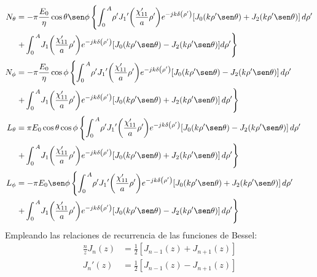 \begin{subequations}
\label{grup_ec_apC:28}
\begin{align}
N_{\theta} &= - \pi\dfrac{E_0}{\eta}\cos\theta\sen\phi\left\{\int_{0}^{\,A}\!\rho '{J_1}'\!\left(\frac{\chi '_{11}}{a}\rho '\right)\!e^{-jk\delta\left(\rho '\right)}\!\left[J_0\!\left(k\rho '\sen\theta\right) + J_2\!\left(k\rho '\sen\theta\right)\right]d\rho '\right.\notag\\
&\left.+\int_{0}^{\,A}\!J_1\!\left(\frac{\chi '_{11}}{a}\rho '\right)\!e^{-jk\delta\left(\rho '\right)}\!\left[J_0\!\left(k\rho '\sen\theta\right) - J_2\!\left(k\rho '\sen\theta\right)\right]\!d\rho '\right\}
\label{ec_apC:125}\\
N_{\phi} &= - \pi\dfrac{E_0}{\eta}\cos\phi\left\{\int_{0}^{\,A}\!\rho '{J_1}'\!\left(\frac{\chi '_{11}}{a}\rho '\right)\!e^{-jk\delta\left(\rho '\right)}\!\left[J_0\!\left(k\rho '\sen\theta\right) - J_2\!\left(k\rho '\sen\theta\right)\right]d\rho '\right.\notag\\
&\left.+\int_{0}^{\,A}\!J_1\!\left(\frac{\chi '_{11}}{a}\rho '\right)\!e^{-jk\delta\left(\rho '\right)}\!\left[J_0\!\left(k\rho '\sen\theta\right) + J_2\!\left(k\rho '\sen\theta\right)\right]d\rho '\right\}
\label{ec_apC:126}\\
L_{\theta}  &= \pi E_0\cos\theta\cos\phi\left\{\int_{0}^{\,A}\!\rho '{J_1}'\!\left(\frac{\chi '_{11}}{a}\rho '\right)\!e^{-jk\delta\left(\rho '\right)}\!\left[J_0\!\left(k\rho '\sen\theta\right) - J_2\!\left(k\rho '\sen\theta\right)\right]d\rho '\right.\notag\\
&\left.+\int_{0}^{\,A}\!J_1\!\left(\frac{\chi '_{11}}{a}\rho '\right)\!e^{-jk\delta\left(\rho '\right)}\!\left[J_0\!\left(k\rho '\sen\theta\right) + J_2\!\left(k\rho '\sen\theta\right)\right]d\rho '\right\}
\label{ec_apC:127}\\
L_{\phi} &= - \pi E_0\sen\phi\left\{\int_{0}^{\,A}\!\rho '{J_1}'\!\left(\frac{\chi '_{11}}{a}\rho '\right)\!e^{-jk\delta\left(\rho '\right)}\!\left[J_0\!\left(k\rho '\sen\theta\right) + J_2\!\left(k\rho '\sen\theta\right)\right]d\rho '\right.\notag\\
&\left.+\int_{0}^{\,A}\!J_1\!\left(\frac{\chi '_{11}}{a}\rho '\right)\!e^{-jk\delta\left(\rho '\right)}\!\left[J_0\!\left(k\rho '\sen\theta\right) - J_2\!\left(k\rho '\sen\theta\right)\right]d\rho '\right\}
\label{ec_apC:128}
\end{align}
\end{subequations}
Empleando las relaciones de recurrencia de las funciones de Bessel:
\begin{align}
\frac{n}{z}J_n\!\left(z\right) &= \frac{1}{2}\left[J_{n - 1}\!\left(z\right) + J_{n + 1}\!\left(z\right)\right]
\label{ec_apC:129}\\
{J_n}'\!\left(z\right) &= \frac{1}{2}\left[J_{n - 1}\!\left(z\right) - J_{n + 1}\!\left(z\right)\right]
\label{ec_apC:130}
\end{align}
